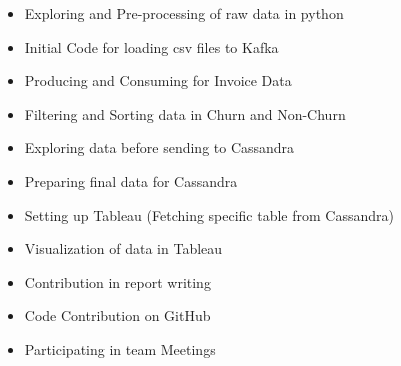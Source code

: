 \documentclass{article}
\begin{document}
\begin{itemize}
  \item Exploring and Pre-processing of raw data in python
  \item Initial Code for loading csv files to Kafka
  \item Producing and Consuming for Invoice Data
  \item Filtering and Sorting data in Churn and Non-Churn
  \item Exploring data before sending to Cassandra
  \item Preparing final data for Cassandra
  \item Setting up Tableau (Fetching specific table from Cassandra)
  \item Visualization of data in Tableau
  \item Contribution in report writing
  \item Code Contribution on GitHub
  \item Participating in team Meetings
\end{itemize}
\end{document}
